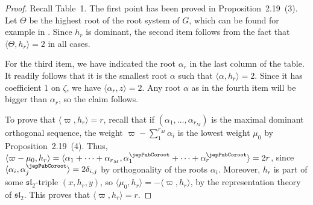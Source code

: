 \begin{proof}
Recall Table~1. The first point has been proved in Proposition~2.19~(3). Let $\Theta$ be the highest root of the root system of $G$, which can be found for example in \cite{jep93Bou68}. Since $h_r$ is dominant, the second item follows from the fact that $\langle\Theta,h_r\rangle=2$ in all cases.

For the third item, we have indicated the root $\alpha_r$ in the last column of the table. It readily follows that it is the smallest root $\alpha$ such that $\langle\alpha,h_r\rangle=2$. Since it has coefficient $1$ on $\zeta$, we have $\langle\alpha_r,z\rangle=2$. Any root $\alpha$ as in the fourth item will be bigger than $\alpha_r$, so the claim follows.

To prove that $\langle\varpi,h_r\rangle=r$, recall that if $(\alpha_1,\ldots,\alpha_{r_M})$ is the maximal dominant orthogonal sequence, the weight $\varpi-\sum_{1}^{r_M}\alpha_i$ is the lowest weight $\mu_0$ by Proposition~2.19~(4). Thus, $\langle\varpi-\mu_0,h_r\rangle=\langle\alpha_1+\cdots+\alpha_{r_M},\alpha_1^\jepPubCoroot+\cdots+\alpha_r^\jepPubCoroot\rangle=2r$, since $\langle\alpha_i,\alpha_j^\jepPubCoroot\rangle=2\delta_{i,j}$ by orthogonality of the roots $\alpha_i$. Moreover, $h_r$ is part of some $\mathfrak{sl}_2$-triple $(x,h_r,y)$, so $\langle\mu_0,h_r\rangle=-\langle\varpi,h_r\rangle$, by the representation theory of $\mathfrak{sl}_2$. This proves that $\langle\varpi,h_r\rangle=r$.
\end{proof}

